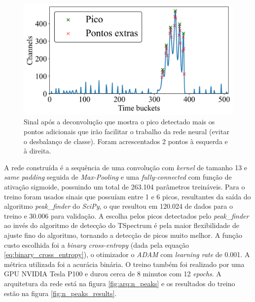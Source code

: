\documentclass[a4paper,12pt,oneside]{book}
\begin{document}
\begin{figure}[H]
    \centering
    \includegraphics[scale = 0.7]{figs/np_ex1.png}
    \caption{Sinal após a deconvolução que mostra o pico detectado mais os pontos adicionais que irão facilitar o trabalho da rede neural (evitar o desbalanço de classe). Foram acrescentados 2 pontos à esquerda e à direita.}
    \label{fig:n_peaks_exs}
\end{figure}

\par A rede construída é a sequência de uma convolução com \textit{kernel} de tamanho 13 e \textit{same padding} seguida de \textit{Max-Pooling} e uma \textit{fully-connected} com função de ativação sigmoide, possuindo um total de 263.104 parâmetros treináveis. Para o treino foram usados sinais que possuíam entre 1 e 6 picos, resultantes da saída do algoritmo \textit{peak\_finder} do \textit{SciPy}, o que resultou em 120.024 de dados para o treino e 30.006 para validação. A escolha pelos picos detectados pelo \textit{peak\_finder} ao invés do algoritmo de detecção do TSpectrum é pela maior flexibilidade de ajuste fino do algoritmo, tornando a detecção de picos muito melhor. A função custo escolhida foi a \textit{binary cross-entropy} (dada pela equação \ref{eq:binary_cross_entropy}), o otimizador o \textit{ADAM} com \textit{learning rate} de 0.001. A métrica utilizada foi a acurácia binária. O treino também foi realizado por uma GPU NVIDIA Tesla P100 e durou cerca de 8 minutos com 12 \textit{epochs}. A arquitetura da rede está na figura \ref{fig:arq:n_peaks} e os resultados do treino estão na figura \ref{fig:n_peaks_results}.
\end{document}
